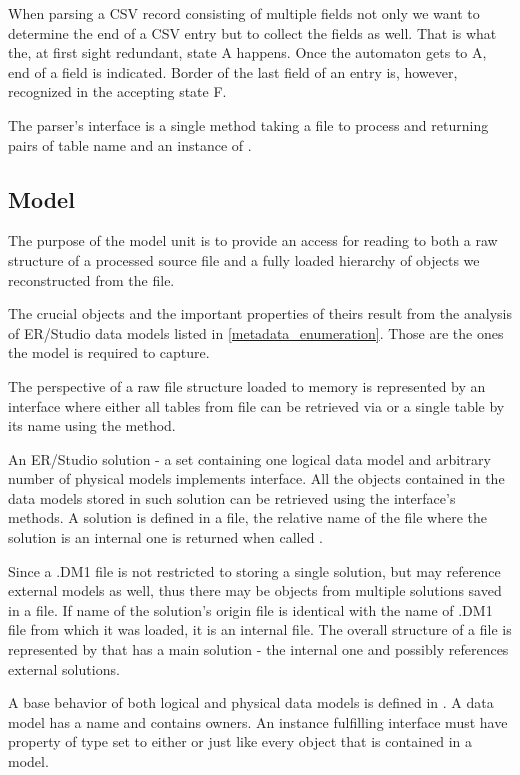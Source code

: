 When parsing a CSV record consisting of multiple fields not only we want to determine the end of a CSV entry but to collect the fields as well. That is what the, at first sight redundant, state A happens. Once the automaton gets to A, end of a field is indicated. Border of the last field of an entry is, however, recognized in the accepting state F.

The parser's interface is a single method  taking a file to process and returning pairs of table name and an instance of .

\subsection{Model}

The purpose of the model unit is to provide an access for reading to both a raw structure of a processed source file and a fully loaded hierarchy of objects we reconstructed from the file.

The crucial objects and the important properties of theirs result from the analysis of ER/Studio data models listed in \autoref{metadata_enumeration}. Those are the ones the model is required to capture.

The perspective of a raw file structure loaded to memory is represented by an interface  where either all tables from file can be retrieved via  or a single table by its name using the  method.

An ER/Studio solution - a set containing one logical data model and arbitrary number of physical models implements  interface. All the objects contained in the data models stored in such solution can be retrieved using the interface's methods. A solution is defined in a file, the relative name of the file where the solution is an internal one is returned when called .


Since a .DM1 file is not restricted to storing a single solution, but may reference external models as well, thus there may be objects from multiple solutions saved in a file. If name of the solution's origin file is identical with the name of .DM1 file from which it was loaded, it is an internal file. The overall structure of a file is represented by  that has a main solution - the internal one and possibly references external solutions.

A base behavior of both logical and physical data models is defined in .
A data model has a name and contains owners. An instance fulfilling  interface must have property of type  set to either  or  just like every object that is contained in a model.

